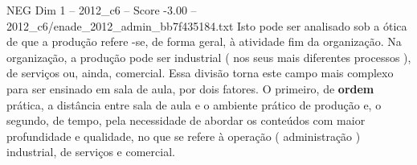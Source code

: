 \begin{textsample}{NEG Dim 1 – 2012\_c6 – Score -3.00 – 2012\_c6/enade\_2012\_admin\_bb7f435184.txt}
Isto pode ser analisado sob a ótica de que a produção refere -se, de forma geral, à atividade fim da organização.
Na organização, a produção pode ser industrial ( nos seus mais diferentes processos ), de serviços ou, ainda, comercial.
Essa divisão torna este campo mais complexo para ser ensinado em sala de aula, por dois fatores.
O primeiro, de \textbf{ordem} prática, a distância entre sala de aula e o ambiente prático de produção e, o segundo, de tempo, pela necessidade de abordar os conteúdos com maior profundidade e qualidade, no que se refere à operação ( administração ) industrial, de serviços e comercial.

\end{textsample}

